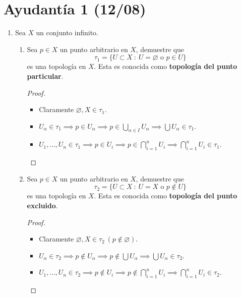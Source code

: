 
\section{Ayudantía 1 (12/08)}

\begin{enumerate}
	\item Sea $X$ un conjunto infinito.
	\begin{enumerate}
		\item Sea $p \in X$ un punto arbitrario en $X$, demuestre que
		\[
		\tau_1 = \{ U \subset X \ : \ U = \varnothing \text{ o } p \in U \}
		\]
		es una topología en $X$. Esta es conocida como \textbf{topología del punto particular}.
		\begin{proof}~
			\begin{itemize}
				\item Claramente $\varnothing, X \in \tau_1$.

				\item $U_{\alpha} \in \tau_1 \implies p \in U_{\alpha} \implies p \in \bigcup_{\alpha \in I} U_{\alpha} \implies \bigcup U_{\alpha} \in \tau_1$.

				\item $U_1,\dots,U_n \in \tau_1 \implies p \in U_i \implies p \in \displaystyle\bigcap_{i=1}^{n} U_i \implies \displaystyle\bigcap_{i=1}^{n} U_i \in \tau_1$.
			\end{itemize}
		\end{proof}

		\item Sea $p \in X$ un punto arbitrario en $X$, demuestre que
		\[
		\tau_2 = \{ U \subset X \ : \ U = X \text{ o } p \not\in U \}
		\]
		es una topología en $X$. Esta es conocida como \textbf{topología del punto excluido}.
		\begin{proof}~
			\begin{itemize}
				\item Claramente $\varnothing, X \in \tau_2 \ (p \not\in \varnothing)$.

				\item $U_{\alpha} \in \tau_2 \implies p \not\in U_{\alpha} \implies p \not\in \bigcup U_{\alpha} \implies \bigcup U_{\alpha} \in \tau_2$.

				\item $U_1,\dots,U_n \in \tau_2 \implies p \not\in U_i \implies p \not\in \displaystyle\bigcap_{i=1}^{n} U_i \implies \displaystyle\bigcap_{i=1}^{n} U_i \in \tau_2$.
			\end{itemize}
		\end{proof}


\end{enumerate}
\end{enumerate}
